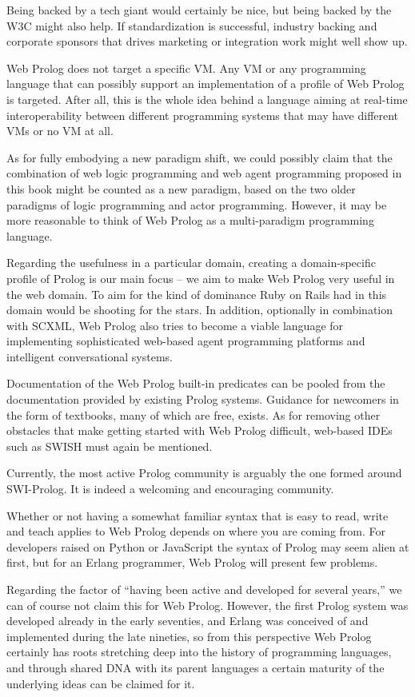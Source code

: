 Being backed by a tech giant would certainly be nice, but being backed by the W3C might also help. If standardization is successful, industry backing and corporate sponsors that drives marketing or integration work might well show up.

Web Prolog does not target a specific VM. Any VM or any programming language that can possibly support an implementation of a profile of Web Prolog is targeted. After all, this is the whole idea behind a language aiming at real-time interoperability between different programming systems that may have different VMs or no VM at all.

As for fully embodying a new paradigm shift, we could possibly claim that the combination of web logic programming and web agent programming proposed in this book might be counted as a new paradigm, based on the two older paradigms of logic programming and actor programming. However, it may be more reasonable to think of Web Prolog as a multi-paradigm programming language.

Regarding the usefulness in a particular domain, creating a domain-specific profile of Prolog is our main focus -- we aim to make Web Prolog very useful in the web domain. To aim for the kind of dominance Ruby on Rails had in this domain would be shooting for the stars. In addition, optionally in combination with SCXML, Web Prolog also tries to become a viable language for implementing sophisticated web-based agent programming platforms and intelligent conversational systems.

Documentation of the Web Prolog built-in predicates can be pooled from the documentation provided by existing Prolog systems. Guidance for newcomers in the form of textbooks, many of which are free, exists. As for removing other obstacles that make getting started with Web Prolog difficult, web-based IDEs such as SWISH must again be mentioned.

Currently, the most active Prolog community is arguably the one formed around SWI-Prolog. It is indeed a welcoming and encouraging community.

Whether or not having a somewhat familiar syntax that is easy to read, write and teach applies to Web Prolog depends on where you are coming from. For developers raised on Python or JavaScript the syntax of Prolog may seem alien at first, but for an Erlang programmer, Web Prolog will present few problems. %

Regarding the factor of ``having been active and developed for several years,'' we can of course not claim this for Web Prolog. However, the first Prolog system was developed already in the early seventies, and Erlang was conceived of and implemented during the late nineties, so from this perspective Web Prolog certainly has roots stretching deep into the history of programming languages, and through shared DNA with its parent languages a certain maturity of the underlying ideas can be claimed for it.

